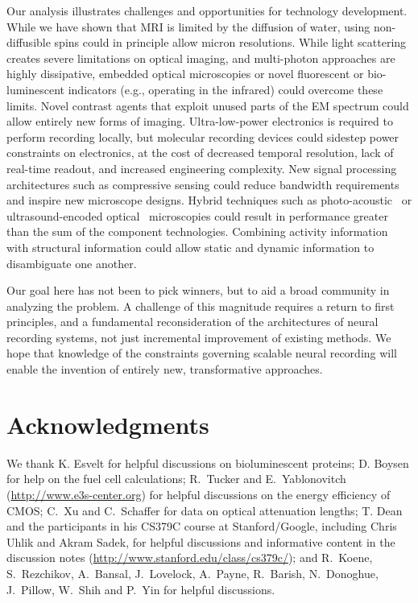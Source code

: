 Our analysis illustrates challenges and opportunities for technology development.
While we have shown that MRI is limited by the diffusion of water, using non-diffusible spins could in principle allow micron resolutions.
While light scattering creates severe limitations on optical imaging, and multi-photon approaches are highly dissipative, embedded optical microscopies or novel fluorescent or bio-luminescent indicators (e.g., operating in the infrared) could overcome these limits.
Novel contrast agents that exploit unused parts of the EM spectrum could allow entirely new forms of imaging.
Ultra-low-power electronics is required to perform recording locally, but molecular recording devices could sidestep power constraints on electronics, at the cost of decreased temporal resolution, lack of real-time readout, and increased engineering complexity.
New signal processing architectures such as compressive sensing could reduce bandwidth requirements and inspire new microscope designs.
Hybrid techniques such as photo-acoustic~\cite{filonov12} or ultrasound-encoded optical~\cite{wang12} microscopies could result in performance greater than the sum of the component technologies.
Combining activity information with structural information could allow static and dynamic information to disambiguate one another.

Our goal here has not been to pick winners, but to aid a broad community in analyzing the problem.
A challenge of this magnitude requires a return to first principles, and a fundamental reconsideration of the architectures of neural recording systems, not just incremental improvement of existing methods.
We hope that knowledge of the constraints governing scalable neural recording will enable the invention of entirely new, transformative approaches.

\section{Acknowledgments}

We thank K. Esvelt for helpful discussions on bioluminescent proteins; D. Boysen for help on the fuel cell calculations; R.~Tucker and E.~Yablonovitch (\url{http://www.e3s-center.org}) for helpful discussions on the energy efficiency of CMOS; C.~Xu and C.~Schaffer for data on optical attenuation lengths; T. Dean and the participants in his CS379C course at Stanford/Google, including Chris Uhlik and Akram Sadek, for helpful discussions and informative content in the discussion notes (\url{http://www.stanford.edu/class/cs379c/}); and R.~Koene, S.~Rezchikov, A.~Bansal, J.~Lovelock, A.~Payne, R.~Barish, N.~Donoghue, J.~Pillow, W.~Shih and P.~Yin for helpful discussions.

